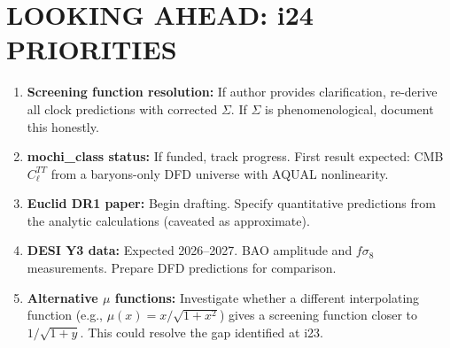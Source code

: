 \documentclass[11pt]{article}
\begin{document}
\section{LOOKING AHEAD: i24 PRIORITIES}

\begin{enumerate}
\item \textbf{Screening function resolution:}  If author provides
  clarification, re-derive all clock predictions with corrected $\Sigma$.
  If $\Sigma$ is phenomenological, document this honestly.

\item \textbf{mochi\_class status:}  If funded, track progress.
  First result expected: CMB $C_\ell^{TT}$ from a baryons-only DFD
  universe with AQUAL nonlinearity.

\item \textbf{Euclid DR1 paper:}  Begin drafting.  Specify quantitative
  predictions from the analytic calculations (caveated as approximate).

\item \textbf{DESI Y3 data:}  Expected 2026--2027.  BAO amplitude
  and $f\sigma_8$ measurements.  Prepare DFD predictions for comparison.

\item \textbf{Alternative $\mu$ functions:}  Investigate whether a
  different interpolating function (e.g., $\mu(x) = x/\sqrt{1+x^2}$)
  gives a screening function closer to $1/\sqrt{1+y}$.  This could
  resolve the gap identified at i23.
\end{enumerate}
\end{document}
